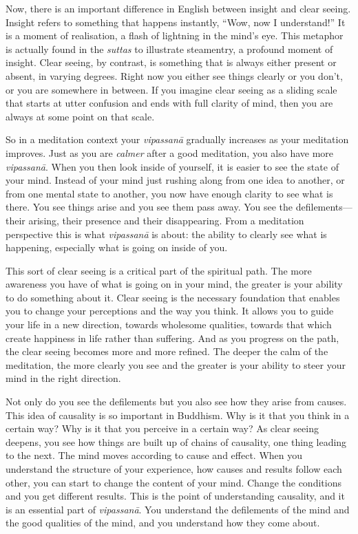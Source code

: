 \documentclass[12pt,openany]{book}
\begin{document}
Now, there is an important difference in English between insight and clear seeing. Insight refers to something that happens instantly, “Wow, now I understand!” It is a moment of realisation, a flash of lightning in the mind’s eye. This metaphor is actually found in the \textit{suttas} to illustrate steamentry, a profound moment of insight. Clear seeing, by contrast, is something that is always either present or absent, in varying degrees. Right now you either see things clearly or you don't, or you are somewhere in between. If you imagine clear seeing as a sliding scale that starts at utter confusion and ends with full clarity of mind, then you are always at some point on that scale.

So in a meditation context your \textit{vipassanā} gradually increases as your meditation improves. Just as you are \textit{calmer} after a good meditation, you also have more \textit{vipassanā}. When you then look inside of yourself, it is easier to see the state of your mind. Instead of your mind just rushing along from one idea to another, or from one mental state to another, you now have enough clarity to see what is there. You see things arise and you see them pass away. You see the defilements—their arising, their presence and their disappearing. From a meditation perspective this is what \textit{vipassanā} is about: the ability to clearly see what is happening, especially what is going on inside of you.

This sort of clear seeing is a critical part of the spiritual path. The more awareness you have of what is going on in your mind, the greater is your ability to do something about it. Clear seeing is the necessary foundation that enables you to change your perceptions and the way you think. It allows you to guide your life in a new direction, towards wholesome qualities, towards that which create happiness in life rather than suffering. And as you progress on the path, the clear seeing becomes more and more refined. The deeper the calm of the meditation, the more clearly you see and the greater is your ability to steer your mind in the right direction.

Not only do you see the defilements but you also see how they arise from causes. This idea of causality is so important in Buddhism. Why is it that you think in a certain way? Why is it that you perceive in a certain way? As clear seeing deepens, you see how things are built up of chains of causality, one thing leading to the next. The mind moves according to cause and effect. When you understand the structure of your experience, how causes and results follow each other, you can start to change the content of your mind. Change the conditions and you get different results. This is the point of understanding causality, and it is an essential part of \textit{vipassanā}. You understand the defilements of the mind and the good qualities of the mind, and you understand how they come about.
\end{document}
